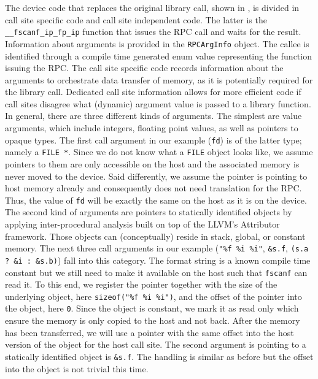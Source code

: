 The device code that replaces the original library call, shown in , is divided in call site specific code and call site independent code.
The latter is the \lstinline{__fscanf_ip_fp_ip} function that issues the RPC call and waits for the result.
Information about arguments is provided in the \lstinline|RPCArgInfo| object.
The callee is identified through a compile time generated enum value representing the function issuing the RPC.
The call site specific code records information about the arguments to orchestrate data transfer of memory, as it is potentially required for the library call.
Dedicated call site information allows for more efficient code if call sites disagree what (dynamic) argument value is passed to a library function.
In general, there are three different kinds of arguments.
The simplest are value arguments, which include integers, floating point values, as well as pointers to opaque types.
The first call argument in our example (\lstinline|fd|) is of the latter type; namely a \lstinline|FILE *|. 
Since we do not know what a \lstinline|FILE| object looks like, we assume pointers to them are only accessible on the host and the associated memory is never moved to the device.
Said differently, we assume the pointer is pointing to host memory already and consequently does not need translation for the RPC.
Thus, the value of \lstinline|fd| will be exactly the same on the host as it is on the device.
The second kind of arguments are pointers to statically identified objects by applying inter-procedural analysis built on top of the LLVM's Attributor framework.
Those objects can (conceptually) reside in stack, global, or constant memory.
The next three call arguments in our example (\lstinline{"%f %i %i"}, \lstinline{&s.f}, \lstinline{(s.a ? &i : &s.b)}) fall into this category.
The format string is a known compile time constant but we still need to make it available on the host such that \lstinline|fscanf| can read it.
To this end, we register the pointer together with the size of the underlying object, here \lstinline|sizeof("%f %i %i")|, and the offset of the pointer into the object, here \lstinline|0|.
Since the object is constant, we mark it as read only which ensure the memory is only copied to the host and not back.
After the memory has been transferred, we will use a pointer with the same offset into the host version of the object for the host call site.
The second argument is pointing to a statically identified object is \lstinline|&s.f|.
The handling is similar as before but the offset into the object is not trivial this time.
